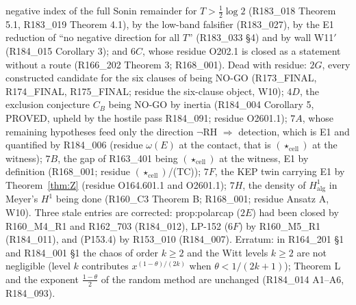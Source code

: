 \documentclass[11pt]{amsart}
\theoremstyle{definition}
\theoremstyle{remark}
\begin{document}
negative index of the full Sonin remainder for $T>\frac12\log2$ (R183\_018 Theorem 5.1, R183\_019 Theorem 4.1), by the low-band falsifier (R183\_027), by the E1 reduction of ``no negative direction for all $T$'' (R183\_033 \S4) and by wall W11$'$ (R184\_015 Corollary 3); and $6C$, whose residue O202.1 is closed as a statement without a route (R166\_202 Theorem 3; R168\_001). Dead with residue: $2G$, every constructed candidate for the six clauses of \cite[\S28.4]{Paper46} being NO-GO (R173\_FINAL, R174\_FINAL, R175\_FINAL; residue the six-clause object, W10); $4D$, the exclusion conjecture $C_B$ being NO-GO by inertia (R184\_004 Corollary 5, PROVED, upheld by the hostile pass R184\_091; residue O2601.1); $7A$, whose remaining hypotheses feed only the direction $\neg$RH $\Rightarrow$ detection, which is E1 and quantified by R184\_006 (residue $\omega(E)$ at the contact, that is $(\star_{\mathrm{cell}})$ at the witness); $7B$, the gap of R163\_401 being $(\star_{\mathrm{cell}})$ at the witness, E1 by definition (R168\_001; residue $(\star_{\mathrm{cell}})$/(TC)); $7F$, the KEP twin carrying E1 by Theorem~\ref{thm:Z} (residue O164.601.1 and O2601.1); $7H$, the density of $H^1_{\mathrm{alg}}$ in Meyer's $H^1$ being done (R160\_C3 Theorem B; R168\_001; residue Ansatz A, W10). Three stale entries are corrected: prop:polarcap ($2E$) had been closed by R160\_M4\_R1 and R162\_703 (R184\_012), LP-152 ($6F$) by R160\_M5\_R1 (R184\_011), and (P153.4) by R153\_010 (R184\_007). Erratum: in R164\_201 \S1 and R184\_001 \S1 the chaos of order $k\ge2$ and the Witt levels $k\ge2$ are not negligible (level $k$ contributes $x^{(1-\theta)/(2k)}$ when $\theta<1/(2k+1)$); Theorem L and the exponent $\frac{1-\theta}2$ of the random method are unchanged (R184\_014 A1--A6, R184\_093).
\end{document}
